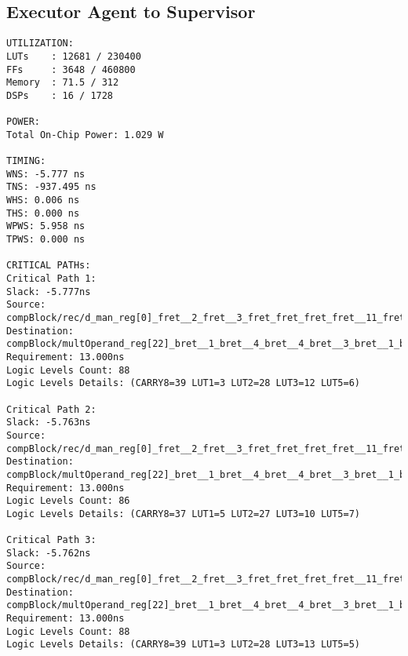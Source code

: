 \subsection{Executor Agent to Supervisor}
\vspace{-0.5em}
\begin{reviewerbox}
\begin{lstlisting}
UTILIZATION:
LUTs    : 12681 / 230400
FFs     : 3648 / 460800
Memory  : 71.5 / 312
DSPs    : 16 / 1728

POWER:
Total On-Chip Power: 1.029 W 

TIMING:
WNS: -5.777 ns
TNS: -937.495 ns
WHS: 0.006 ns
THS: 0.000 ns
WPWS: 5.958 ns
TPWS: 0.000 ns

CRITICAL PATHs:
Critical Path 1:
Slack: -5.777ns
Source: compBlock/rec/d_man_reg[0]_fret__2_fret__3_fret_fret_fret_fret__11_fret__1_fret__3/C
Destination: compBlock/multOperand_reg[22]_bret__1_bret__4_bret__4_bret__3_bret__1_bret__27/D
Requirement: 13.000ns
Logic Levels Count: 88
Logic Levels Details: (CARRY8=39 LUT1=3 LUT2=28 LUT3=12 LUT5=6)

Critical Path 2:
Slack: -5.763ns
Source: compBlock/rec/d_man_reg[0]_fret__2_fret__3_fret_fret_fret_fret__11_fret__1_fret__3/C
Destination: compBlock/multOperand_reg[22]_bret__1_bret__4_bret__4_bret__3_bret__1_bret__22/D
Requirement: 13.000ns
Logic Levels Count: 86
Logic Levels Details: (CARRY8=37 LUT1=5 LUT2=27 LUT3=10 LUT5=7)

Critical Path 3:
Slack: -5.762ns
Source: compBlock/rec/d_man_reg[0]_fret__2_fret__3_fret_fret_fret_fret__11_fret__1_fret__3/C
Destination: compBlock/multOperand_reg[22]_bret__1_bret__4_bret__4_bret__3_bret__1_bret__41_bret/D
Requirement: 13.000ns
Logic Levels Count: 88
Logic Levels Details: (CARRY8=39 LUT1=3 LUT2=28 LUT3=13 LUT5=5)
\end{lstlisting}
\end{reviewerbox}

